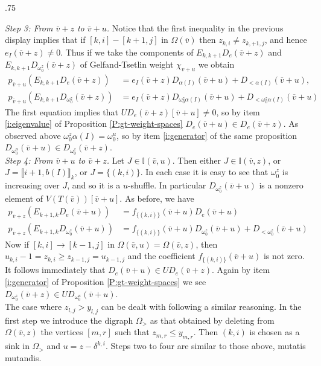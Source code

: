 \documentclass[11pt,fleqn]{amsart}
\makeatletter
\renewcommand\proofname{Proof}
\renewenvironment{proof}[1][\textit{\proofname}]{\par
 \pushQED{\qed}%
 \normalfont \topsep.75\paraskip\relax
 \trivlist
 \item[\hskip\labelsep
 \itshape
 #1\@addpunct{.}]\ignorespaces
}{%
 \popQED\endtrivlist\@endpefalse
}
\newcounter{para}[section]
\newcommand\vv{\overline{v}}
\newcommand\II{\mathbb I}
\newcommand\interval[1]{\llbracket #1 \rrbracket}
\makeatother
\begin{document}
\begin{proof}
\emph{Step 3: From $\vv+z$ to $\vv + u$.}
Notice that the first inequality in the previous display implies that if 
$[k,i] - [k+1,j]$ in $\Omega(\vv)$ then $z_{k,i} \neq z_{k,+1,j}$, and hence 
$e_I(\vv+z) \neq 0$. Thus if we take the components of $E_{k,k+1} 
D_{e}(\vv + z)$ and $E_{k,k+1} D_{\omega_0^z}(\vv + z)$ of Gelfand-Tsetlin 
weight $\chi_{v+u}$ we obtain
\begin{align*}
p_{\vv+u}(E_{k,k+1} D_{e}(\vv + z))
	& = e_I(\vv+z) D_{\alpha(I)}(\vv + u) + D_{<\alpha(I)}(\vv + u),\\
p_{\vv+u}(E_{k,k+1} D_{\omega_0^z}(\vv + z))
	& = e_{I}(\vv + z) D_{\omega_0^z \alpha(I)}(\vv + u) 
	+ D_{<\omega_0^z \alpha(I)}(\vv + u)
\end{align*}
The first equation implies that $U D_e(\vv + z) [\vv + u] \neq 0$, so by
item \ref{i:eigenvalue} of Proposition \ref{P:gt-weight-spaces} $D_e(\vv + u)
\in D_e(\vv + z)$. As observed above $\omega_0^z \alpha(I) = \omega_0^u$, so 
by item \ref{i:generator} of the same proposition $D_{\omega_0^u}(\vv + u) \in 
D_{\omega_0^z}(\vv + z)$. \\

\emph{Step 4: From $\vv + u$ to $\vv + z$.}
Let $J \in \II(\vv, u)$. Then either $J \in \II(\vv, z)$, or $J = 
\interval{i+1,b(I)}_k$, or $J = \{(k,i)\}$. In each case it is easy to see 
that $\omega_0^z$ is increasing over $J$, and so it is a $u$-shuffle. In 
particular $D_{\omega_0^z}(\vv + u)$ is a nonzero element of $V(T(\vv))[\vv + 
u]$. As before, we have
\begin{align*}
p_{\vv+z}(E_{k+1,k} D_{e}(\vv + u))
	&= f_{\{(k,i)\}}(\vv + u) D_e(\vv + u) \\
p_{\vv+z}(E_{k+1,k} D_{\omega_0^z}(\vv + u))
	&=f_{\{(k,i)\}}(\vv + u) D_{\omega_0^z}(\vv + u) + D_{<\omega_0^z}(\vv + u)
\end{align*}
Now if $[k,i] \rightarrow [k-1,j]$ in $\Omega(\vv,u) = 
\Omega(\vv,z)$, then $u_{k,i} - 1 = z_{k,i} \geq z_{k-1,j} = u_{k-1,j}$ and 
the coefficient $f_{\{(k,i)\}}(\vv + u)$ is not zero. It follows immediately 
that $D_e(\vv + u) \in U D_e(\vv + z)$. Again by item \ref{i:generator} of 
Proposition \ref{P:gt-weight-spaces} we see $D_{\omega_0^z}(\vv + z) \in 
U D_{\omega_0^u}(\vv + u)$. \\

The case where $z_{l,j} > y_{l,j}$ can be dealt with following a similar 
reasoning. In the first step we introduce the digraph $\Omega_>$ as that 
obtained by deleting from $\Omega(\vv,z)$ the vertices $[m,r]$ such that 
$z_{m,r} \leq y_{m,r}$. Then $(k,i)$ is chosen as a sink in $\Omega_>$ and $u 
= z - \delta^{k,i}$. Steps two to four are similar to those above, mutatis 
mutandis.
\end{proof}
\end{document}
